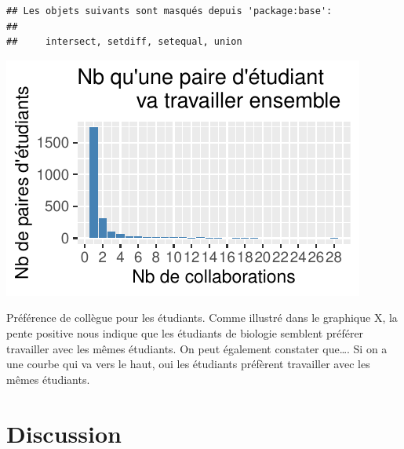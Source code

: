 \documentclass[9pt,twocolumn,twoside,]{pnas-new}
\begin{document}
\begin{verbatim}
## Les objets suivants sont masqués depuis 'package:base':
## 
##     intersect, setdiff, setequal, union
\end{verbatim}

\includegraphics{Rmarkdown_Reseau_Ecologique_files/figure-latex/unnamed-chunk-2-1.pdf}

Préférence de collègue pour les étudiants. Comme illustré dans le
graphique X, la pente positive nous indique que les étudiants de
biologie semblent préférer travailler avec les mêmes étudiants. On peut
également constater que\ldots. Si on a une courbe qui va vers le haut,
oui les étudiants préfèrent travailler avec les mêmes étudiants.

\hypertarget{discussion}{%
\section{Discussion}\label{discussion}}
\end{document}
